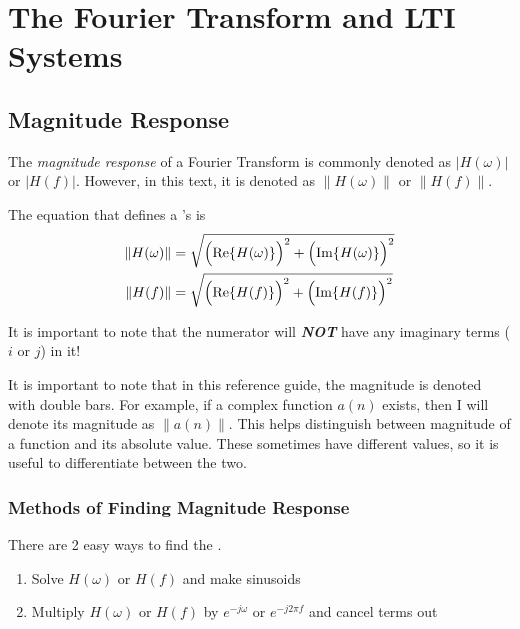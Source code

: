 \section{The Fourier Transform and LTI Systems}\label{sec:Fourier_Transform-LTI_Systems}
\subsection{Magnitude Response}\label{subsec:Fourier_Magnitude_Response}
\begin{definition}\label{def:Fourier_Magnitude_Response}
  The \emph{magnitude response} of a Fourier Transform is commonly denoted as $\lvert H(\omega) \rvert$ or $\lvert H(f) \rvert$.
  However, in this text, it is denoted as $\lVert H(\omega) \rVert$ or $\lVert H(f) \rVert$.

  The equation that defines a 's  is
  \begin{equation}\label{eq:Fourier_Magnitude_Response}
    \begin{aligned}
      \lVert H(\omega) \rVert &= \sqrt{{\Bigl( \Re \lbrace H(\omega) \rbrace \Bigr)}^{2} + {\Bigl( \Im \lbrace H(\omega) \rbrace \Bigr)}^{2}} \\
      \lVert H(f) \rVert &= \sqrt{{\Bigl( \Re \lbrace H(f) \rbrace \Bigr)}^{2} + {\Bigl( \Im \lbrace H(f) \rbrace \Bigr)}^{2}} \\
    \end{aligned}
  \end{equation}

  \begin{remark}
    It is important to note that the numerator will \textbf{\emph{NOT}} have any imaginary terms ($i$ or $j$) in it!
  \end{remark}
\end{definition}

\begin{remark*}
  It is important to note that in this reference guide, the magnitude is denoted with double bars.
  For example, if a complex function $a(n)$ exists, then I will denote its magnitude as $\lVert a(n) \rVert$.
  This helps distinguish between magnitude of a function and its absolute value.
  These sometimes have different values, so it is useful to differentiate between the two.
\end{remark*}

\subsubsection{Methods of Finding Magnitude Response}\label{subsubsec:Fourier_Magnitude_Response_Methods}
There are 2 easy ways to find the .
\begin{enumerate}[noitemsep]
\item Solve $H(\omega)$ or $H(f)$ and make sinusoids
\item Multiply $H(\omega)$ or $H(f)$ by $e^{-j \omega}$ or $e^{-j 2\pi f}$ and cancel terms out
\end{enumerate}


